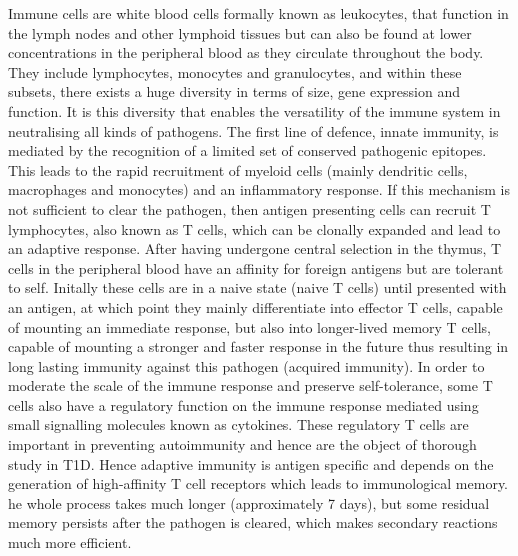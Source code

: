 Immune cells are white blood cells formally known as leukocytes, that function in the lymph nodes and other lymphoid tissues but can also be found at lower concentrations in the peripheral blood as they circulate throughout the body.
They include lymphocytes, monocytes and granulocytes, and within these subsets, there exists a huge diversity in terms of size, gene expression and function.
It is this diversity that enables the versatility of the immune system in neutralising all kinds of pathogens.
The first line of defence, innate immunity, is mediated by the recognition of a limited set of conserved pathogenic epitopes.
This leads to the rapid recruitment of myeloid cells (mainly dendritic cells, macrophages and monocytes) and an inflammatory response.
If this mechanism is not sufficient to clear the pathogen, then antigen presenting cells can recruit T lymphocytes, also known as T cells, which can be clonally expanded and lead to an adaptive response.
After having undergone central selection in the thymus, T cells in the peripheral blood have an affinity for foreign antigens but are tolerant to self.
Initally these cells are in a naive state (naive T cells) until presented with an antigen, at which point they mainly differentiate into effector T cells, capable of mounting an immediate response, but also into longer-lived memory T cells, capable of mounting a stronger and faster response in the future thus resulting in long lasting immunity against this pathogen (acquired immunity).
In order to moderate the scale of the immune response and preserve self-tolerance, some T cells also have a regulatory function on the immune response mediated using small signalling molecules known as cytokines.
These regulatory T cells are important in preventing autoimmunity and hence are the object of thorough study in T1D.
Hence adaptive immunity is antigen specific and depends on the generation of high-affinity T cell receptors which leads to immunological memory.
he whole process takes much longer (approximately 7 days), but some residual memory persists after the pathogen is cleared, which makes secondary reactions much more efficient.

